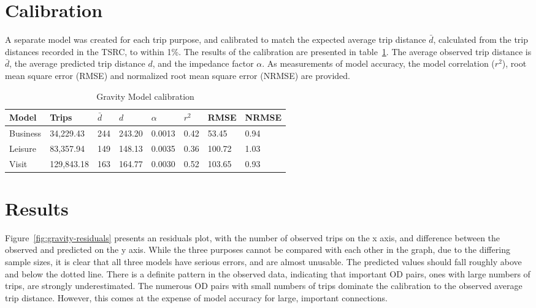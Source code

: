 \section{Calibration}
A separate model was created for each trip purpose, and calibrated to match the expected average trip distance $\bar{d}$, calculated from the trip distances recorded in the TSRC, to within 1\%. The results of the calibration are presented in table~\ref{table:gravity-calibration}. The average observed trip distance is $\bar{d}$, the average predicted trip distance $d$, and the impedance factor $\alpha$. As measurements of model accuracy, the model correlation ($r^2$), root mean square error (RMSE) and normalized root mean square error (NRMSE) are provided.

\begin{table}[H]
\centering
\caption{Gravity Model calibration}
\label{table:gravity-calibration}
\begin{tabular}{@{}lllll|lll@{}}
\toprule
Model & Trips & $\bar{d}$ & $d$ & $\alpha$ & $r^2$ & RMSE & NRMSE \\ \midrule
   Business  & 34,229.43  &     244     &  243.20   & 0.0013  & 0.42 & 53.45 & 0.94 \\
   Leisure   & 83,357.94  &     149     &  148.13   & 0.0035  & 0.36 & 100.72 & 1.03 \\
   Visit     & 129,843.18 &     163     &  164.77   & 0.0030 & 0.52 & 103.65 & 0.93 \\ \bottomrule
\end{tabular}
\end{table}

\section{Results}
Figure~\ref{fig:gravity-residuals} presents an residuals plot, with the number of observed trips on the x axis, and difference between the observed and predicted on the y axis. While the three purposes cannot be compared with each other in the graph, due to the differing sample sizes, it is clear that all three models have serious errors, and are almost unusable. The predicted values should fall roughly above and below the dotted line. There is a definite pattern in the observed data, indicating that important OD pairs, ones with large numbers of trips, are strongly underestimated. The numerous OD pairs with small numbers of trips dominate the calibration to the observed average trip distance. However, this comes at the expense of model accuracy for large, important connections.


